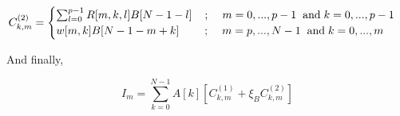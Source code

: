 \documentclass[]{article}
\newcommand{\AND}{\hspace{0.2cm} \mathrm{and} \hspace{0.1cm}}
\begin{document}
\[
C^{(2)}_{k,m} =\begin{cases}
            \sum_{l=0}^{p-1} R[m,k,l] B[N-1-l] \hspace{0.4cm}; \hspace{0.4cm} m=0,...,p-1 \AND k=0,...,p-1\\
            w[m,k] B[N-1-m+k] \hspace{0.8cm}; \hspace{0.4cm} m=p,...,N-1 \AND k=0,...,m
            \end{cases}
\]

And finally,

\[
I_m = \sum_{k=0}^{N-1} A[k] \left[ C^{(1)}_{k,m} + \xi_B C^{(2)}_{k,m} \right] 
\]
\end{document}
